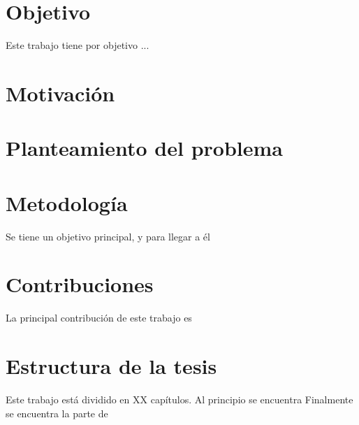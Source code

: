 \section{Objetivo}

Este trabajo tiene por objetivo ...
\blindtext
\section{Motivación}


\blindtext

\section{Planteamiento del problema}
\blindtext
\section{Metodología}

Se tiene un objetivo principal, y para llegar a \'el %
\blindtext

\section{Contribuciones}

La principal contribución de este trabajo es 
\blindtext

\section{Estructura de la tesis}

Este trabajo está dividido en XX capítulos. Al principio se encuentra 
Finalmente se encuentra la parte de 